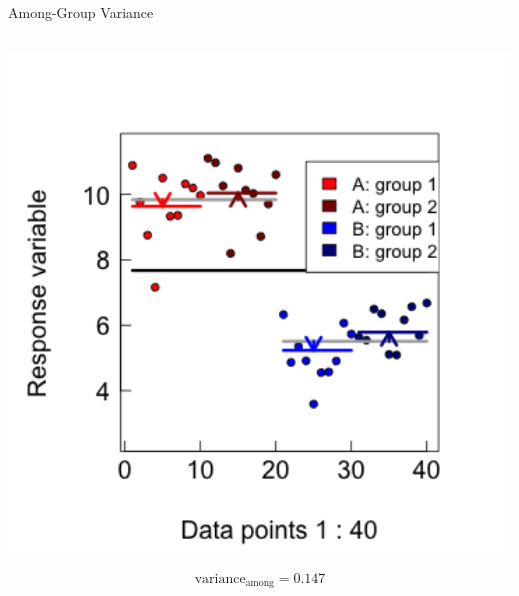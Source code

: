 \documentclass{beamer}
\begin{document}
\begin{frame}{Among-Group Variance}
\begin{columns}[onlytextwidth]
\begin{column}{0.5\textwidth}
\begin{center}
        \includegraphics[width=0.999\textwidth]{lectures/day_1_intro_to_mems/figures/unnamed-chunk-28-1.png}
      \end{center}
        \[ \text{variance}_{\text{among}} = 0.147 \]
    \end{column}
  \end{columns}
  
\end{frame}
\end{document}
